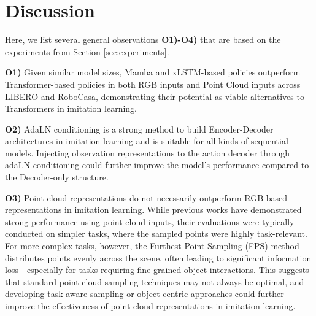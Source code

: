 \section{Discussion} \label{sec: discussion}
Here, we list several general observations \textbf{O1)-O4)} that are based on the experiments from Section \ref{sec:experiments}.

\textbf{O1)} Given similar model sizes, Mamba and xLSTM-based policies outperform Transformer-based policies in both RGB inputs and Point Cloud inputs across LIBERO and RoboCasa, demonstrating their potential as viable alternatives to Transformers in imitation learning. 

\textbf{O2)} AdaLN conditioning is a strong method to build Encoder-Decoder architectures in imitation learning and is suitable for all kinds of sequential models. Injecting observation representations to the action decoder through adaLN conditioning could further improve the model's performance compared to the Decoder-only structure.

\textbf{O3)} Point cloud representations do not necessarily outperform RGB-based representations in imitation learning. While previous works have demonstrated strong performance using point cloud inputs, their evaluations were typically conducted on simpler tasks, where the sampled points were highly task-relevant.
For more complex tasks, however, the Furthest Point Sampling (FPS) method distributes points evenly across the scene, often leading to significant information loss—especially for tasks requiring fine-grained object interactions. This suggests that standard point cloud sampling techniques may not always be optimal, and developing task-aware sampling or object-centric approaches could further improve the effectiveness of point cloud representations in imitation learning.


